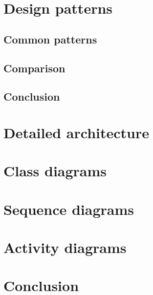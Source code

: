 \section{Design patterns}
\subsection{Common patterns}
\subsection{Comparison}
\subsection{Conclusion}

\section{Detailed architecture}
\section{Class diagrams}
\section{Sequence diagrams}
\section{Activity diagrams}

\section{Conclusion}